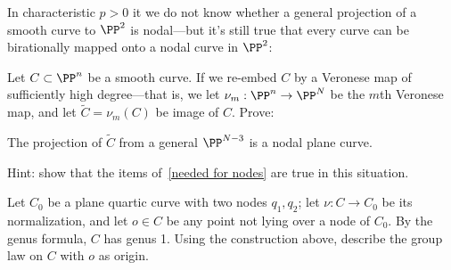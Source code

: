 In characteristic $p > 0$ it we do not know whether a general projection of a smooth curve to $\PP^2$ is nodal---but it's still true that every curve can be birationally mapped onto a nodal curve in $\PP^2$:

\begin{exercise}
Let $C\subset \PP^n$ be a smooth curve. If we re-embed $C$ by a Veronese map of sufficiently high degree---that is, we let $\nu_m : \PP^n \to \PP^N$ be the $m$th Veronese map, and let $\widetilde C = \nu_m(C)$ be image of $C$. Prove:

\begin{proposition}\label{positive characteristic nodes}
The projection of $\widetilde C$ from a general $\PP^{N-3}$ is a nodal plane curve.
\end{proposition}

Hint: show that the items of~\ref{needed for nodes}  are true in this situation.
\end{exercise}

\begin{exercise}
Let $C_0$ be a plane quartic curve with two nodes $q_1, q_2$; let $\nu : C \to C_0$ be its normalization, and let $o \in C$ be any point not lying over a node of $C_0$.
By the genus formula, $C$ has genus 1. Using the construction above, describe the group law on $C$ with $o$ as origin.
\end{exercise}


